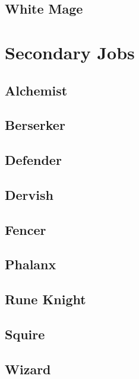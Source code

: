 \subsection{White Mage}



\section{Secondary Jobs}
\label{subsec:sjob}

\subsection{Alchemist}


\subsection{Berserker}


\subsection{Defender}


\subsection{Dervish}


\subsection{Fencer}


\subsection{Phalanx}


\subsection{Rune Knight}


\subsection{Squire}


\subsection{Wizard}

